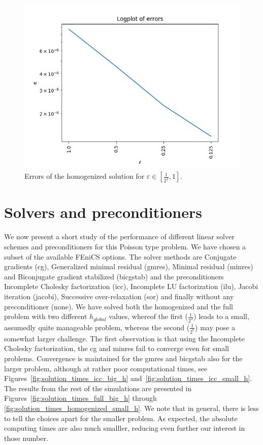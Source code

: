\documentclass{article}
\renewcommand{\epsilon}{\varepsilon}
\begin{document}
   \begin{figure}[h]
    \centering
    \includegraphics[width=0.8\linewidth]{carw_errors.png}
    \caption{Errors of the homogenized solution for $\epsilon \in [\frac{1}{2^3}, 1]$.}
    \label{fig:car_errors}
  \end{figure}
  
  \section{Solvers and preconditioners}
  We now present a short study of the performance of different linear solver schemes and preconditioners for this Poisson type problem. We have chosen a subset of the available FEniCS options. The solver methods are Conjugate gradients (cg), Generalized minimal residual (gmres), Minimal residual (minres) and Biconjugate gradient stabilized (bicgstab) and the preconditioners Incomplete Cholesky factorization (icc), Incomplete LU factorization (ilu),  Jacobi iteration (jacobi), Successive over-relaxation (sor) and finally without any preconditioner (none). We have solved both the homogenized and the full problem with two different $h_{global}$ values, whereof the first ($\frac{1}{2^3}$) leads to a small, assumedly quite manageable problem, whereas the second ($\frac{1}{2^7}$) may pose a somewhat larger challenge.
  The first observation is that using the Incomplete Cholesky factorization, the cg and minres fail to converge even for small problems. Convergence is maintained for the gmres and bicgstab also for the larger problem, although at rather poor computational times, see Figures~\ref{fig:solution_times_icc_big_h} and~\ref{fig:solution_times_icc_small_h}. The results from the rest of the simulations are presented in Figures~\ref{fig:solution_times_full_big_h} through \ref{fig:solution_times_homogenized_small_h}. We note that in general, there is less to tell the choices apart for the smaller problem. As expected, the absolute computing times are also much smalller, reducing even further our interest in those number.
\end{document}
